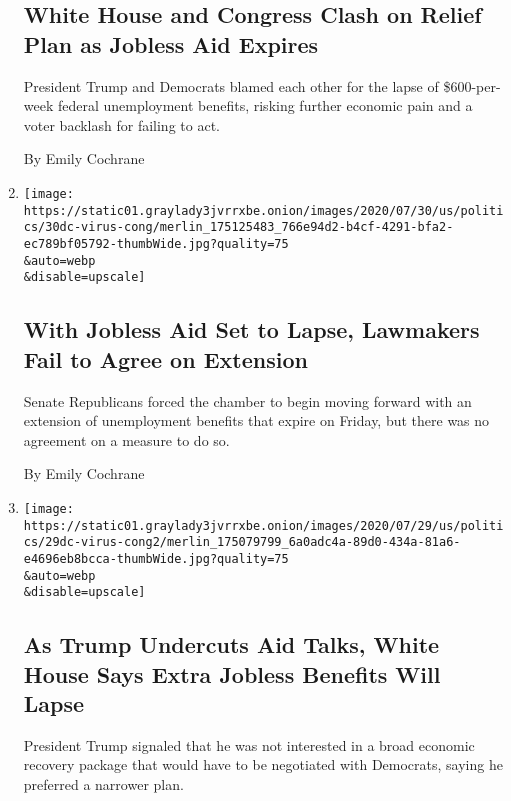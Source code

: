 \begin{enumerate}
{  \subsection{White House and Congress Clash on Relief Plan as Jobless
  Aid
  Expires}\label{white-house-and-congress-clash-on-relief-plan-as-jobless-aid-expires}}

  President Trump and Democrats blamed each other for the lapse of
  \$600-per-week federal unemployment benefits, risking further economic
  pain and a voter backlash for failing to act.

  By Emily Cochrane
\item
  \href{/2020/07/30/us/politics/senate-virus-aid.html}{}

  \texttt{[image: https://static01.graylady3jvrrxbe.onion/images/2020/07/30/us/politics/30dc-virus-cong/merlin\_175125483\_766e94d2-b4cf-4291-bfa2-ec789bf05792-thumbWide.jpg?quality=75\\\&auto=webp\\\&disable=upscale]}

  \hypertarget{with-jobless-aid-set-to-lapse-lawmakers-fail-to-agree-on-extension}{%
  \subsection{With Jobless Aid Set to Lapse, Lawmakers Fail to Agree on
  Extension}\label{with-jobless-aid-set-to-lapse-lawmakers-fail-to-agree-on-extension}}

  Senate Republicans forced the chamber to begin moving forward with an
  extension of unemployment benefits that expire on Friday, but there
  was no agreement on a measure to do so.

  By Emily Cochrane
\item
  \href{/2020/07/29/business/economy/virus-aid-trump.html}{}

  \texttt{[image: https://static01.graylady3jvrrxbe.onion/images/2020/07/29/us/politics/29dc-virus-cong2/merlin\_175079799\_6a0adc4a-89d0-434a-81a6-e4696eb8bcca-thumbWide.jpg?quality=75\\\&auto=webp\\\&disable=upscale]}

  \hypertarget{as-trump-undercuts-aid-talks-white-house-says-extra-jobless-benefits-will-lapse}{%
  \subsection{As Trump Undercuts Aid Talks, White House Says Extra
  Jobless Benefits Will
  Lapse}\label{as-trump-undercuts-aid-talks-white-house-says-extra-jobless-benefits-will-lapse}}

  President Trump signaled that he was not interested in a broad
  economic recovery package that would have to be negotiated with
  Democrats, saying he preferred a narrower plan.


\end{enumerate}
